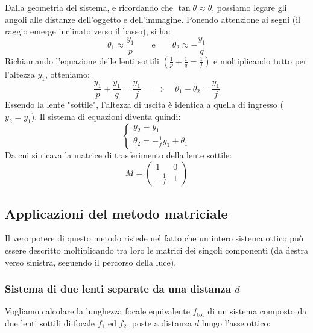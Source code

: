\documentclass[openany,a4paper,12pt]{book}
\begin{document}
\begin{itemize}
Dalla geometria del sistema, e ricordando che $\tan \theta \approx \theta$, possiamo legare gli angoli alle distanze dell'oggetto e dell'immagine. Ponendo attenzione ai segni (il raggio emerge inclinato verso il basso), si ha:
\begin{equation}
    \theta_1 \approx \frac{y_1}{p} \qquad \text{e} \qquad \theta_2 \approx - \frac{y_1}{q}
\end{equation}
Richiamando l'equazione delle lenti sottili $\left(\frac{1}{p} + \frac{1}{q} = \frac{1}{f}\right)$ e moltiplicando tutto per l'altezza $y_1$, otteniamo:
\begin{equation}
    \frac{y_1}{p} + \frac{y_1}{q} = \frac{y_1}{f} \quad \implies \quad \theta_1 - \theta_2 = \frac{y_1}{f}
\end{equation}
Essendo la lente "sottile", l'altezza di uscita è identica a quella di ingresso ($y_2 = y_1$). Il sistema di equazioni diventa quindi:
\begin{equation}
    \begin{cases}
        y_2 = y_1 \\
        \theta_2 = -\frac{1}{f} y_1 + \theta_1
    \end{cases}
\end{equation}
Da cui si ricava la matrice di trasferimento della lente sottile:
\begin{equation}
    M = 
    \begin{pmatrix}
        1 & 0 \\ 
       -\frac{1}{f} & 1
    \end{pmatrix}
\end{equation}

\end{itemize}


\subsection*{Applicazioni del metodo matriciale}

Il vero potere di questo metodo risiede nel fatto che un intero sistema ottico può essere descritto moltiplicando tra loro le matrici dei singoli componenti (da destra verso sinistra, seguendo il percorso della luce).

\subsubsection{Sistema di due lenti separate da una distanza $d$}
Vogliamo calcolare la lunghezza focale equivalente $f_{\text{tot}}$ di un sistema composto da due lenti sottili di focale $f_1$ ed $f_2$, poste a distanza $d$ lungo l'asse ottico:
\end{document}
